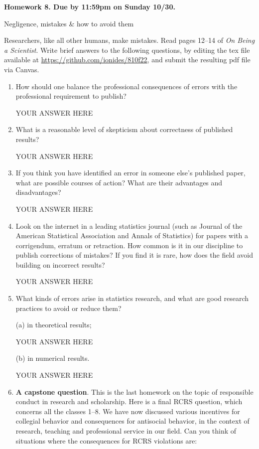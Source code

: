 \documentclass[12pt]{article}
\begin{document}
\begin{center}\bf
Homework 8. Due by 11:59pm on Sunday 10/30.

Negligence, mistakes \& how to avoid them

\end{center}
Researchers, like all other humans, make mistakes. Read pages 12--14 of {\em On Being a Scientist}.  Write brief answers to the following questions, by editing the tex file available at \url{https://github.com/ionides/810f22}, and submit the resulting pdf file via Canvas.

\begin{enumerate}

\item How should one balance the professional consequences of errors with the professional requirement to publish?
  
YOUR ANSWER HERE

\item What is a reasonable level of skepticism about correctness of published results?

YOUR ANSWER HERE
  
\item If you think you have identified an error in someone else's published paper, what are possible courses of action? What are their advantages and disadvantages?

YOUR ANSWER HERE

\item Look on the internet in a leading statistics journal (such as Journal of the American Statistical Association and Annals of Statistics) for papers with a corrigendum, erratum or retraction. How common is it in our discipline to publish corrections of mistakes? If you find it is rare, how does the field avoid building on incorrect results?

YOUR ANSWER HERE

\item What kinds of errors arise in statistics research, and what are good research practices to avoid or reduce them?

(a) in theoretical results;

YOUR ANSWER HERE
    
(b) in numerical results.

YOUR ANSWER HERE

\item {\bf A capstone question}. This is the last homework on the topic of responsible conduct in research and scholarship.  Here is a final RCRS question, which concerns all the classes 1--8. We have now discussed various incentives for collegial behavior and consequences for antisocial behavior, in the context of research, teaching and professional service in our field. Can you think of situations where the consequences for RCRS violations are:


\end{enumerate}
\end{document}
